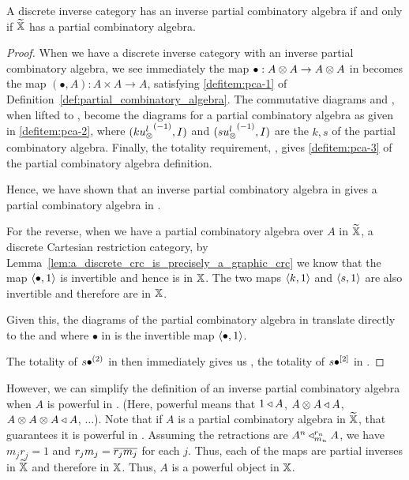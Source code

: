 \begin{proposition}\label{prop:inverse-pca-iff-pca}
  A discrete inverse category \X has an inverse partial combinatory algebra if and only if $\widetilde{\mathbb{X}}$ has
  a partial combinatory algebra.
\end{proposition}
\begin{proof}
  When we have a discrete inverse category \X with an inverse partial combinatory algebra, we see
  immediately the map $\bullet:A\otimes A\to A\otimes A$ in \X becomes the map $(\bullet,A):A\times A \to A$,
  satisfying \ref{defitem:pca-1} of Definition~\ref{def:partial_combinatory_algebra}. The
  commutative diagrams  and , when lifted to \Xt, become the diagrams
  for a partial combinatory algebra as given in \ref{defitem:pca-2}, where $(k{u_{\otimes}^l}^{(-1)}, I)$ and
  $(s{u_{\otimes}^l}^{(-1)}, I)$ are the $k,s$ of the partial combinatory algebra. Finally, the totality
  requirement, , gives \ref{defitem:pca-3} of the partial combinatory algebra
  definition.

  Hence, we have shown that an inverse partial combinatory algebra in \X gives a partial combinatory
  algebra in \Xt.

  For the reverse, when we have a partial combinatory algebra over $A$ in $\widetilde{\mathbb{X}}$, a discrete Cartesian
  restriction category, by Lemma~\ref{lem:a_discrete_crc_is_precisely_a_graphic_crc} we know that
  the map $\langle\bullet,1\rangle$ is invertible and hence is in $\mathbb{X}$. The two maps $\langle k,1\rangle$ and $\langle s,1\rangle$
  are also invertible and therefore are in $\mathbb{X}$.

  Given this, the diagrams of the partial combinatory algebra in \Xt translate directly to the
   and  where $\bullet$ in \X is the invertible map $\langle\bullet,1\rangle$.

  The totality  of $s {\bullet}^{(2)}$ in \Xt then immediately gives us , the
  totality of $s {\bullet}^{[2]}$ in \X.


\end{proof}

However, we can simplify the definition of an inverse partial combinatory algebra when $A$ is
powerful in \X. (Here, powerful means that $1\triangleleft A$, $A\otimes A\triangleleft A$, $A\otimes A\otimes A\triangleleft A$,
$\ldots$). Note that if $A$ is a partial combinatory algebra in $\widetilde{\mathbb{X}}$, that guarantees it is
powerful in \Xt. Assuming the retractions are $A^n \triangleleft_{m_n}^{r_n} A$, we have $m_j r_j =
1$ and $r_j m_j = \overline{r_j m_j}$ for each $j$. Thus, each of the maps are partial inverses in
$\widetilde{\mathbb{X}}$ and therefore in $\mathbb{X}$. Thus, $A$ is a powerful object in $\mathbb{X}$.

